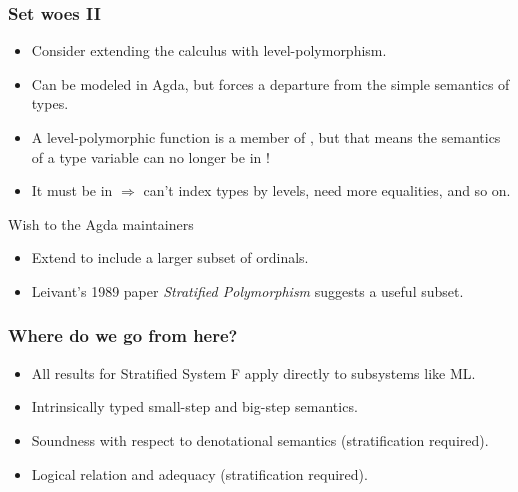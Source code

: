 \documentclass[dvipsnames,aspectratio=169,pdftex]{beamer}
\begin{document}
\begin{frame}
  \frametitle{Set woes II}
  \begin{itemize}
  \item Consider extending the calculus with level-polymorphism.
  \item Can be modeled in Agda, but forces a departure from the simple semantics of types.
  \item A level-polymorphic function is a member of , but that means the semantics of a type variable can no longer be in  !
  \item It must be in  $\Longrightarrow$ can't index types by levels, need more equalities, and so on.
  \end{itemize}
  \begin{exampleblock}{Wish to the  Agda maintainers}
    \begin{itemize}
    \item Extend  to include a larger subset of ordinals.
    \item Leivant's 1989 paper \emph{Stratified Polymorphism} suggests a useful subset.
    \end{itemize}
  \end{exampleblock}
\end{frame}
\begin{frame}
  \frametitle{Where do we go from here?}
  \begin{itemize}
  \item All results for Stratified System F apply directly to subsystems like ML.
  \item Intrinsically typed small-step and big-step semantics.
  \item Soundness with respect to denotational semantics (stratification required).
  \item Logical relation and adequacy (stratification required).
  \end{itemize}
\end{frame}
\end{document}
